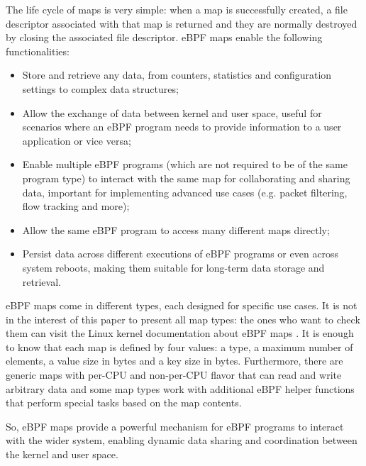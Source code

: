The life cycle of maps is very simple: when a map is successfully created, a file descriptor associated with that map is returned and they are normally destroyed by closing the associated file descriptor.
eBPF maps enable the following functionalities:

\begin{itemize}
	\item 
		Store and retrieve any data, from counters, statistics and configuration settings to complex data structures;
	\item 
		Allow the exchange of data between kernel and user space, useful for scenarios where an eBPF program needs to provide information to a user application or vice versa;
	\item 
		Enable multiple eBPF programs (which are not required to be of the same program type) to interact with the same map for collaborating and sharing data, important for implementing advanced use cases (e.g. packet filtering, flow tracking and more); 
	\item 
		Allow the same eBPF program to access many different maps directly;
	\item 
		Persist data across different executions of eBPF programs or even across system reboots, making them suitable for long-term data storage and retrieval.
\end{itemize}

eBPF maps come in different types, each designed for specific use cases.
It is not in the interest of this paper to present all map types: the ones who want to check them can visit the Linux kernel documentation about eBPF maps \cite{eBPFLinuxMaps}.
It is enough to know that each map is defined by four values: a type, a maximum number of elements, a value size in bytes and a key size in bytes.
Furthermore, there are generic maps with per-CPU and non-per-CPU flavor that can read and write arbitrary data and some map types work with additional eBPF helper functions that perform special tasks based on the map contents.

So, eBPF maps provide a powerful mechanism for eBPF programs to interact with the wider system, enabling dynamic data sharing and coordination between the kernel and user space.

